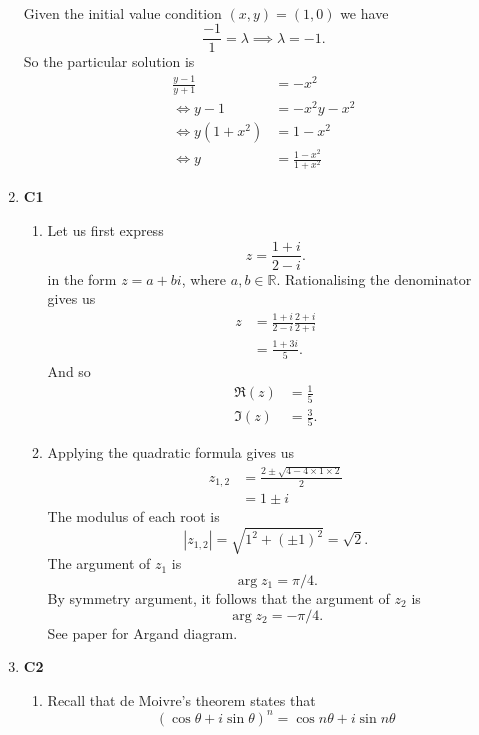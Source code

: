 \documentclass[12pt,oneside]{book}
\begin{document}
\begin{enumerate}
\begin{align*}
        \end{align*}
        Given the initial value condition $(x, y) = (1, 0)$ we have \[
            \frac{-1}{1} = \lambda \implies \lambda = -1
        .\] 
        So the particular solution is \begin{align*}
            \frac{y - 1}{y + 1} &= -x^2 \\
            \iff y - 1 &= -x^2 y - x^2 \\
            \iff y(1 + x^2) &= 1 - x^2 \\
            \iff y &= \frac{1 - x^2}{1 + x^2}
        \end{align*}
        \item \textbf{C1} \begin{enumerate}
            \item Let us first express \[
                z = \frac{1 + i}{2 - i}
            .\] in the form $z = a + bi$, where $a, b \in \mathbb{R}$. Rationalising the denominator gives us \begin{align*}
                z &= \frac{1 + i}{2 - i} \frac{2 + i}{2 + i} \\
                &= \frac{1 + 3i}{5}.
            \end{align*}
            And so \begin{align*}
                \Re(z) &= \frac{1}{5} \\
                \Im(z) &= \frac{3}{5}.
            \end{align*}
            \item Applying the quadratic formula gives us \begin{align*}
                z_{1,2} &= \frac{2 \pm \sqrt{4 - 4 \times 1 \times 2} }{2} \\
                &= 1 \pm i
            \end{align*}
            The modulus of each root is \[
                \left| z_{1,2} \right| = \sqrt{1^2 + (\pm 1)^2} = \sqrt{2}  
            .\] The argument of $z_1$ is \[
                \arg z_1 = \pi/4
            .\] By symmetry argument, it follows that the argument of $z_2$ is \[
                \arg z_2 = -\pi / 4
            .\] 
            See paper for Argand diagram.
        \end{enumerate}
        \item \textbf{C2} \begin{enumerate}
            \item Recall that de Moivre's theorem states that \[
                (\cos \theta + i \sin \theta) ^ n = \cos n \theta + i \sin n \theta
\]
\end{enumerate}
\end{enumerate}
\end{document}
